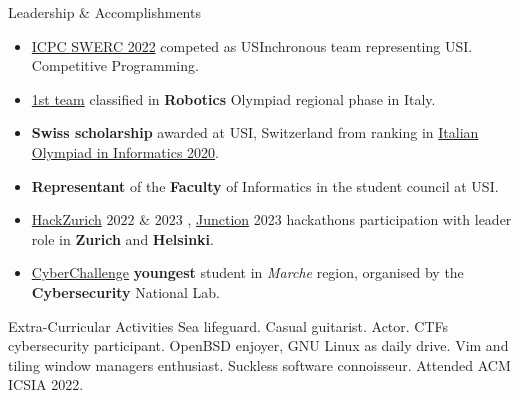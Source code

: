 \documentclass{cv} %
\begin{document}
\begin{rSection}{Leadership \& Accomplishments}
    \begin{itemize}
        \item \href{https://swerc.eu/2022/teams/}{ICPC SWERC 2022}
              competed as USInchronous team representing USI. Competitive Programming.

        \item \href{https://www.makerslab.it/olimpiadi-robotiche-ancona-2019/}{1st team}
              classified in \textbf{Robotics} Olympiad regional phase in Italy.

        \item \textbf{Swiss scholarship} awarded at USI, Switzerland from ranking in
              \href{https://www.olimpiadi-informatica.it/index.php/selezione-territoriale-20.html}{Italian Olympiad in Informatics 2020}.

        \item \textbf{Representant} of the \textbf{Faculty} of Informatics in the student council at USI.
        \item \href{https://hackzurich.com/}{HackZurich} $2022$ \& $2023$ , \href{https://www.junction2023.com/}{Junction} 2023
              hackathons participation with leader role in \textbf{Zurich} and \textbf{Helsinki}.

        \item \href{https://cyberchallenge.it/}{CyberChallenge} \textbf{youngest} student
              in \textit{Marche} region, organised by the \textbf{Cybersecurity} National Lab.
    \end{itemize}
\end{rSection}

\begin{rSection}{Extra-Curricular Activities}
    Sea lifeguard.
    Casual guitarist.
    Actor.
    CTFs cybersecurity participant.
    OpenBSD enjoyer, GNU \text{+} Linux as daily drive.
    Vim and tiling window managers enthusiast.
    Suckless software connoisseur.
    Attended ACM ICSIA 2022.
\end{rSection}
\end{document}
